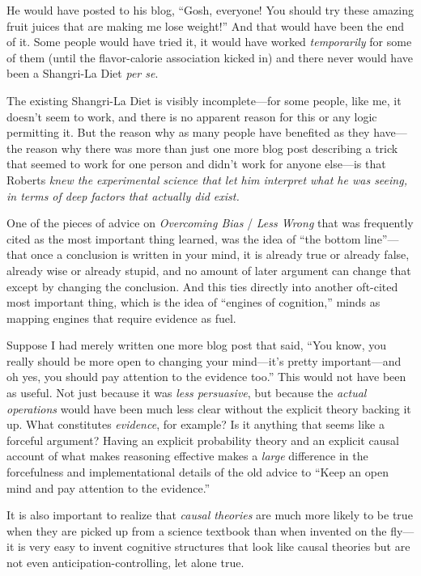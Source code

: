 {
 He would have posted to his blog, ``Gosh,
everyone! You should try these amazing fruit juices that are making me
lose weight!'' And that would have been the end of
it. Some people would have tried it, it would have worked
\textit{temporarily} for some of them (until the flavor-calorie
association kicked in) and there never would have been a Shangri-La
Diet \textit{per se}.}

{
 The existing Shangri-La Diet is visibly incomplete---for some
people, like me, it doesn't seem to work, and there is
no apparent reason for this or any logic permitting it. But the reason
why as many people have benefited as they have---the reason why there
was more than just one more blog post describing a trick that seemed to
work for one person and didn't work for anyone
else---is that Roberts \textit{knew the experimental science that let
him interpret what he was seeing, in terms of deep factors that
actually did exist.}}

{
 One of the pieces of advice on \textit{Overcoming Bias} /
\textit{Less Wrong} that was frequently cited as the most important
thing learned, was the idea of ``the bottom
line''---that once a conclusion is written in your
mind, it is already true or already false, already wise or already
stupid, and no amount of later argument can change that except by
changing the conclusion. And this ties directly into another oft-cited
most important thing, which is the idea of ``engines
of cognition,'' minds as mapping engines that require
evidence as fuel.}

{
 Suppose I had merely written one more blog post that said,
``You know, you really should be more open to changing
your mind---it's pretty important---and oh yes, you
should pay attention to the evidence too.'' This
would not have been as useful. Not just because it was \textit{less
persuasive}, but because the \textit{actual operations} would have been
much less clear without the explicit theory backing it up. What
constitutes \textit{evidence}, for example? Is it anything that seems
like a forceful argument? Having an explicit probability theory and an
explicit causal account of what makes reasoning effective makes a
\textit{large} difference in the forcefulness and implementational
details of the old advice to ``Keep an open mind and
pay attention to the evidence.''}

{
 It is also important to realize that \textit{causal theories} are
much more likely to be true when they are picked up from a science
textbook than when invented on the fly---it is very easy to invent
cognitive structures that look like causal theories but are not even
anticipation-controlling, let alone true.}

